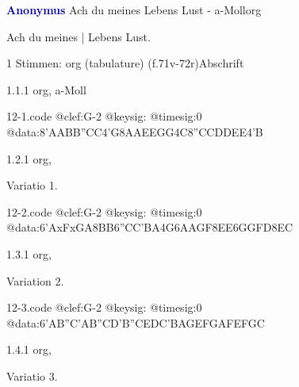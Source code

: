 \documentclass[twocolumn, 12pt]{book}
\begin{document}
\par \vspace{16pt} \textcolor{darkblue}{\textbf{Anonymus  }}\hfillplus{\textbf{[12]}}\newline Ach du meines Lebens Lust - a-Moll\newline org
\par \begin{itshape}[f.78v, at left:] Ach du meines | Lebens Lust.\end{itshape} 
\par \textcolor{darkblue}{}  1 Stimmen: org (tabulature)  (f.71v-72r)\newline Abschrift
\par 1.1.1  org, a-Moll  
\begin{filecontents*}{12-1.code}
@clef:G-2
@keysig:
@timesig:0
@data:{8'AABB}{''CC}4'G{8AAEE}{GG}4C{8''CCDD}{EE}4'B
\end{filecontents*}
\newline %
\par 1.2.1  org, \begin{itshape}Variatio 1.\end{itshape}  
\begin{filecontents*}{12-2.code}
@clef:G-2
@keysig:
@timesig:0
@data:{6'AxFxGA}{8BB}{6''CC'BA}4G{6AAGF}{8EE}{6GGFD}{8EC}
\end{filecontents*}
\newline %
\par 1.3.1  org, \begin{itshape}Variation 2.\end{itshape}  
\begin{filecontents*}{12-3.code}
@clef:G-2
@keysig:
@timesig:0
@data:{6'AB''C'A}{B''CD'B}{''CEDC}{'BAGE}{FGAF}{EFGC}
\end{filecontents*}
\newline %
\par 1.4.1  org, \begin{itshape}Variatio 3.\end{itshape}  
\end{document}
